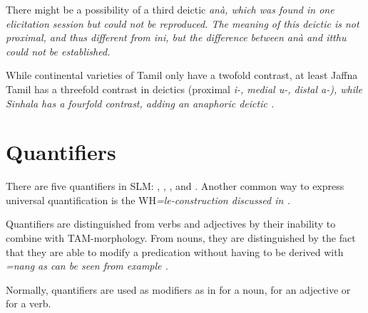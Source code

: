 There might be a possibility of a third deictic \em anà\em, which was found in one elicitation session but could not be reproduced. The meaning of this deictic is not proximal, and thus different from \em ini\em, but the difference between \em anà \em and \em itthu \em could not be established.

While continental varieties of Tamil only have a twofold contrast, at least Jaffna Tamil has a threefold contrast in deictics (proximal \em i-\em, medial \em u-\em, distal \em a-\em), while Sinhala has a fourfold contrast, adding an anaphoric deictic \citep{Gair1982Isolate,Gair1991deixis}.



\section{Quantifiers}\label{sec:wc:Quantifiers}
There are five quantifiers in SLM: , , ,  and . Another common way to express universal quantification is the  WH\em=le\em-construction discussed in .

Quantifiers are distinguished from verbs and adjectives by their inability to combine with TAM-morphology. From nouns, they are distinguished by the fact that they are able to modify a predication without having to be derived with \em =nang \em as can be seen from example .



Normally, quantifiers are used as modifiers  as in  for a noun,  for an adjective or  for a verb.






